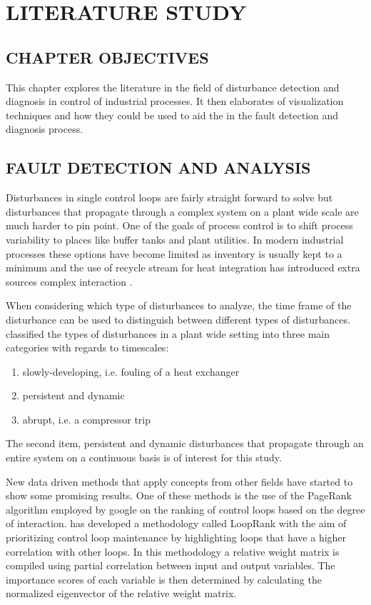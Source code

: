 
\chapter{LITERATURE STUDY}

\section{CHAPTER OBJECTIVES}

This chapter explores the literature in the field of disturbance detection and diagnosis in control of industrial processes. It then elaborates of visualization techniques and how they could be used to aid the in the fault detection and diagnosis process.

\section{FAULT DETECTION AND ANALYSIS}

Disturbances in single control loops are fairly straight forward to solve but disturbances that propagate through a complex system on a plant wide scale are much harder to pin point. One of the goals of process control is to shift process variability to places like buffer tanks and plant utilities. In modern industrial processes these options have become limited as inventory is usually kept to a minimum and the use of recycle stream for heat integration has introduced extra sources complex interaction \cite{thornhill2007advances}.

When considering which type of disturbances to analyze, the time frame of the disturbance can be used to distinguish between different types of disturbances. \cite{thornhill2007advances} classified the types of disturbances in a plant wide setting into three main categories with regards to timescales:
\begin{enumerate}
	\item slowly-developing, i.e. fouling of a heat exchanger
	\item persistent and dynamic
	\item abrupt, i.e. a compressor trip
\end{enumerate}
The second item, persistent and dynamic disturbances that propagate through an entire system on a continuous basis is of interest for this study.

New data driven methods that apply concepts from other fields have started to show some promising results. One of these methods is the use of the PageRank algorithm \cite{bryan200625} employed by google on the ranking of control loops based on the degree of interaction.\cite{farenzena2009looprank} has developed a methodology called LoopRank with the aim of prioritizing control loop maintenance by highlighting loops that have a higher correlation with other loops. In this methodology a relative weight matrix is compiled using partial correlation between input and output variables. The importance scores of each variable is then determined by calculating the normalized eigenvector of the relative weight matrix.\\

